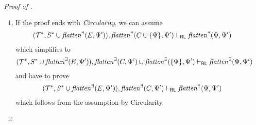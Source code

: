 \begin{proof}[Proof of ]
\begin{enumerate}
\begin{align*}
        \\& \vdash_\RL
        \mathit{cfgheat}(L, X_i, R) \land (\phi^\square)[X_i/\square] \land Q
        \\&\quad \Rightarrow^\exists
        \mathit{cfgheat}(L, X_i, R) \land ((\phi^\prime)^\square)[X_i/\square] \land Q^\prime
        \, .
    \end{align*}
    Now we use Consequence to expand $\phi^\square$ and $(\phi^\prime)^\square$ into equalities,
    perform the substitution, and use the equalities to replace the $X_i$ subterm of $\mathit{cfgheat}$ with
    $\phi$ and $\phi^\prime$, respectively; this way the goal becomes
    \begin{align*}
        & (\mathcal{T}, S)^*, \mathit{flatten}^\exists(E, \psi^\prime), \mathit{flatten}^\exists(C, \psi^\prime)
        \\& \vdash_\RL
        \mathit{cfgheat}(L, \phi, R) \land Q
        \\&\quad \Rightarrow^\exists
        \mathit{cfgheat}(L, \phi^\prime, R) \land Q^\prime
        \, .
    \end{align*}
    We finish the proof of this case using the Axiom rule.
    
    \item If the proof ends with \emph{Circularity}, we can assume
        \begin{align*}
            (\mathcal{T}^*, S^* \cup \mathit{flatten}^\exists(E, \Psi^\prime)),
            \mathit{flatten}^\exists(C \cup \{ \Psi \}, \Psi^\prime) \vdash_{\mathsf{RL}}
            \mathit{flatten}^\exists(\Psi, \Psi^\prime)
        \end{align*}
        which simplifies to
        \begin{align*}
            (\mathcal{T}^*, S^* \cup \mathit{flatten}^\exists(E, \Psi^\prime)),
            \mathit{flatten}^\exists(C, \Psi^\prime) \cup \mathit{flatten}^\exists(\{ \Psi \}, \Psi^\prime) \vdash_{\mathsf{RL}}
            \mathit{flatten}^\exists(\Psi, \Psi^\prime)
        \end{align*}
        and have to prove
        \begin{align*}
            (\mathcal{T}^*, S^* \cup \mathit{flatten}^\exists(E, \Psi^\prime)),
            \mathit{flatten}^\exists(C, \Psi^\prime) \vdash_{\mathsf{RL}}
            \mathit{flatten}^\exists(\Psi, \Psi^\prime)
        \end{align*}
        which follows from the assumption by Circularity.
        

\end{enumerate}
\end{proof}
